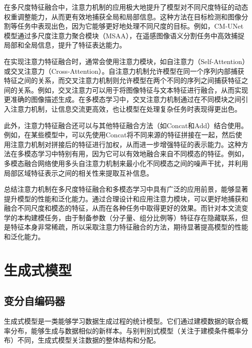 在多尺度特征融合中，注意力机制的应用极大地提升了模型对不同尺度特征的动态权重调整能力，从而更有效地捕获全局和局部信息。这种方法在目标检测和图像分割等任务中表现出色，因为它能够更好地处理不同尺度的目标。例如，CM-UNet模型通过多尺度注意力聚合模块（MSAA），在遥感图像语义分割任务中高效捕捉局部和全局信息，提升了特征表达能力\cite{liu2024cm}。

在实现注意力特征融合时，通常会使用注意力模块，如自注意力（Self-Attention）或交叉注意力（Cross-Attention）。自注意力机制允许模型在同一个序列内部捕获特征之间的关系，而交叉注意力机制则允许模型在两个不同的序列之间捕获特征之间的关系。例如，交叉注意力可以用于将图像特征与文本特征进行融合，从而实现更准确的图像描述生成。在多模态学习中，交叉注意力机制通过在不同模块之间引入注意力机制，让信息交流更高效，也让模型在处理复杂任务时表现得更出色\cite{rong2023dynstatf}。

此外，注意力特征融合还可以与其他特征融合方法（如Concat和Add）结合使用。例如，在某些模型中，可以先使用Concat将不同来源的特征拼接在一起，然后使用注意力机制对拼接后的特征进行加权，从而进一步增强特征的表示能力。这种方法在多模态学习中特别有用，因为它可以有效地融合来自不同模态的特征。例如，多模态融合网络使用多头自注意力机制来最小化不同模态之间的噪声干扰，并利用局部区域特征表示之间的相关性来提取互补信息\cite{nagrani2021attention}。

总结注意力机制在多尺度特征融合和多模态学习中具有广泛的应用前景，能够显著提升模型的性能和泛化能力。通过合理设计和应用注意力模块，可以更好地捕获和融合不同尺度和模态的特征，从而在各种任务中取得更好的效果。而针对本文流变学的本构建模任务，由于制备参数（分子量、组分比例等）特征存在隐藏联系，但是特征本身非常稀疏，所以采取注意力特征融合的方法，期待显著提高模型的性能和泛化能力。
\section{生成式模型}
\subsection{变分自编码器}
生成式模型是一类能够学习数据生成过程的统计模型。它们通过建模数据的联合概率分布，能够生成与数据相似的新样本。与别判别式模型（关注于建模条件概率分布）不同，生成式模型关注数据的整体结构和分配。


